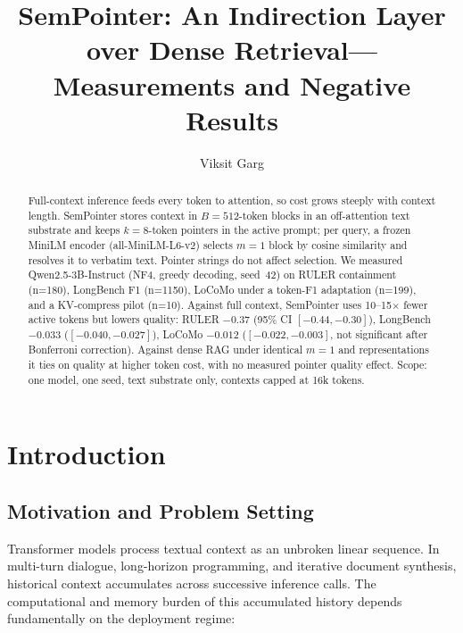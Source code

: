 \documentclass[runningheads]{llncs}
\begin{document}
\title{SemPointer: An Indirection Layer over Dense Retrieval---Measurements and Negative Results}
\author{Viksit Garg}
\maketitle

\begin{abstract}
Full-context inference feeds every token to attention, so cost grows steeply with context length. SemPointer stores context in $B{=}512$-token blocks in an off-attention text substrate and keeps $k{=}8$-token pointers in the active prompt; per query, a frozen MiniLM encoder (all-MiniLM-L6-v2) selects $m{=}1$ block by cosine similarity and resolves it to verbatim text. Pointer strings do not affect selection. We measured Qwen2.5-3B-Instruct (NF4, greedy decoding, seed~42) on RULER containment (n=180), LongBench F1 (n=1150), LoCoMo under a token-F1 adaptation (n=199), and a KV-compress pilot (n=10). Against full context, SemPointer uses 10--15$\times$ fewer active tokens but lowers quality: RULER $-0.37$ (95\% CI $[-0.44,-0.30]$), LongBench $-0.033$ ($[-0.040,-0.027]$), LoCoMo $-0.012$ ($[-0.022,-0.003]$, not significant after Bonferroni correction). Against dense RAG under identical $m{=}1$ and representations it ties on quality at higher token cost, with no measured pointer quality effect. Scope: one model, one seed, text substrate only, contexts capped at 16k tokens.
\end{abstract}


\section{Introduction}

\subsection{Motivation and Problem Setting}\label{sec:motivation}
Transformer models \cite{vaswani2017attention} process textual context as an unbroken linear sequence. In multi-turn dialogue, long-horizon programming, and iterative document synthesis, historical context accumulates across successive inference calls. The computational and memory burden of this accumulated history depends fundamentally on the deployment regime:
\end{document}
